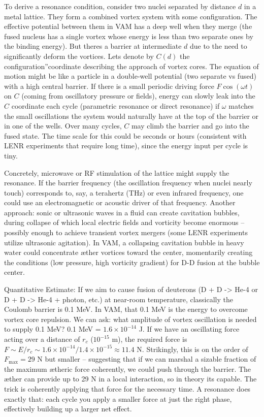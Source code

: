 To derive a resonance condition, consider two nuclei separated by distance $d$ in a metal lattice. They form a combined vortex system with some configuration. The effective potential between them in VAM has a deep well when they merge (the fused nucleus has a single vortex whose energy is less than two separate ones by the binding energy). But there\rqs s a barrier at intermediate $d$ due to the need to significantly deform the vortices. Let\rqs s denote by $C(d)$ the \grqq configuration\textquotedblright coordinate describing the approach of vortex cores. The equation of motion might be like a particle in a double-well potential (two separate vs fused) with a high central barrier. If there is a small periodic driving force $F \cos(\omega t)$ on $C$ (coming from oscillatory pressure or fields), energy can slowly leak into the $C$ coordinate each cycle (parametric resonance or direct resonance) if $\omega$ matches the small oscillations the system would naturally have at the top of the barrier or in one of the wells. Over many cycles, $C$ may climb the barrier and go into the fused state. The time scale for this could be seconds or hours (consistent with LENR experiments that require long time), since the energy input per cycle is tiny.


Concretely, microwave or RF stimulation of the lattice might supply the resonance. If the barrier frequency (the oscillation frequency when nuclei nearly touch) corresponds to, say, a terahertz (THz) or even infrared frequency, one could use an electromagnetic or acoustic driver of that frequency. Another approach: sonic or ultrasonic waves in a fluid can create cavitation bubbles, during collapse of which local electric fields and vorticity become enormous – possibly enough to achieve transient vortex mergers (some LENR experiments utilize ultrasonic agitation). In VAM, a collapsing cavitation bubble in heavy water could concentrate æther vortices toward the center, momentarily creating the conditions (low pressure, high vorticity gradient) for D-D fusion at the bubble center.


Quantitative Estimate: If we aim to cause fusion of deuterons (D + D -> He-4 or D + D -> He-4 + photon, etc.) at near-room temperature, classically the Coulomb barrier is 0.1 MeV. In VAM, that 0.1 MeV is the energy to overcome vortex core repulsion. We can ask: what amplitude of vortex oscillation is needed to supply 0.1 MeV? 0.1 MeV = $1.6\times10^{-14}$ J. If we have an oscillating force acting over a distance of $r_c$ ($10^{-15}$ m), the required force is $F \sim E/r_c \sim 1.6\times10^{-14} / 1.4\times10^{-15} \approx 11.4$ N. Strikingly, this is on the order of $F_{\max}=29$ N but smaller – suggesting that if we can marshal a sizable fraction of the maximum ætheric force coherently, we could push through the barrier. The æther can provide up to 29 N in a local interaction, so in theory it\rqs s capable. The trick is coherently applying that force for the necessary time. A resonance does exactly that: each cycle you apply a smaller force at just the right phase, effectively building up a larger net effect.


